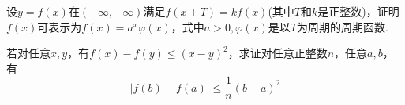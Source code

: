 \begin{xiti}
%	
%	
%	
\item 设$y=f(x)$在$(-\infty,+\infty)$满足$f(x+T)=kf(x)$(其中$T$和$k$是正整数)，证明$f(x)$可表示为$f ( x ) = a ^ { x } \varphi ( x )$，式中$a>0,\varphi(x)$是以$T$为周期的周期函数.

%	
\item 若对任意$x,y$，有$f ( x ) - f ( y ) \leqslant ( x - y ) ^ { 2 }$，求证对任意正整数$n$，任意$a,b$，有
\[| f ( b ) - f ( a ) | \leqslant \frac { 1 } { n } ( b - a ) ^ { 2 }\]
%
\end{xiti}

